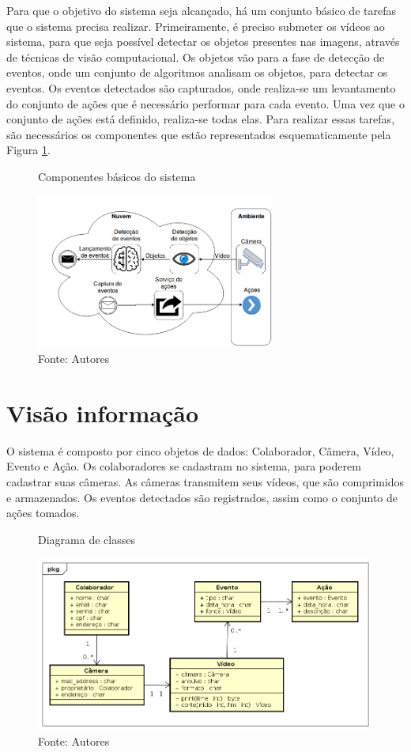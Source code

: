 \documentclass[]{politex}
\begin{document}
Para que o objetivo do sistema seja alcançado, há um conjunto básico de tarefas que o sistema precisa realizar. Primeiramente, é preciso submeter os vídeos ao sistema, para que seja possível detectar os objetos presentes nas imagens, através de técnicas de visão computacional. Os objetos vão para a fase de detecção de eventos, onde um conjunto de algoritmos analisam os objetos, para detectar os eventos. Os eventos detectados são capturados, onde realiza-se um levantamento do conjunto de ações que é necessário performar para cada evento. Uma vez que o conjunto de ações está definido, realiza-se todas elas. Para realizar essas tarefas, são necessários os componentes que estão representados esquematicamente pela Figura \ref{fig:componentes}.

\begin{figure}[H]
    \centering
    \caption{Componentes básicos do sistema}
    \includegraphics[width=0.7\textwidth]{Componentes_basicos}
    \caption*{Fonte: Autores}
    \label{fig:componentes}
\end{figure}

\section{Visão informação}
O sistema é composto por cinco objetos de dados: Colaborador, Câmera, Vídeo, Evento e Ação. Os colaboradores se cadastram no sistema, para poderem cadastrar suas câmeras. As câmeras transmitem seus vídeos, que são comprimidos e armazenados. Os eventos detectados são registrados, assim como o conjunto de ações tomados.

\begin{figure}[H]
    \centering
    \caption{Diagrama de classes}
    \includegraphics[width=\textwidth]{Visao_informacao_total}
    \caption*{Fonte: Autores}
    \label{fig:classeVisao}
\end{figure}
\end{document}
